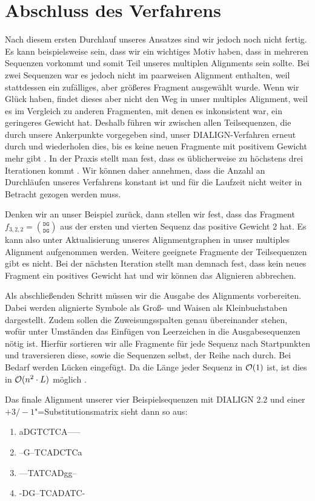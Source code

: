 \section{Abschluss des Verfahrens}

Nach diesem ersten Durchlauf unseres Ansatzes sind wir jedoch noch nicht fertig. Es kann beispielsweise sein, dass wir ein wichtiges Motiv haben, dass in mehreren Sequenzen vorkommt und somit Teil unseres multiplen Alignments sein sollte. Bei zwei Sequenzen war es jedoch nicht im paarweisen Alignment enthalten, weil stattdessen ein zufälliges, aber größeres Fragment ausgewählt wurde. Wenn wir Glück haben, findet dieses aber nicht den Weg in unser multiples Alignment, weil es im Vergleich zu anderen Fragmenten, mit denen es inkonsistent war, ein geringeres Gewicht hat. Deshalb führen wir zwischen allen Teilsequenzen, die durch unsere Ankerpunkte vorgegeben sind, unser DIALIGN-Verfahren erneut durch und wiederholen dies, bis es keine neuen Fragmente mit positivem Gewicht mehr gibt \cite{mdw96}. In der Praxis stellt man fest, dass es üblicherweise zu höchstens drei Iterationen kommt \cite{m99}. Wir können daher annehmen, dass die Anzahl an Durchläufen unseres Verfahrens konstant ist und für die Laufzeit nicht weiter in Betracht gezogen werden muss.

Denken wir an unser Beispiel zurück, dann stellen wir fest, dass das Fragment $f_{3,2,2} = $$ {\texttt{DG}}\choose{\texttt{DG}}$ aus der ersten und vierten Sequenz das positive Gewicht 2 hat. Es kann also unter Aktualisierung unseres Alignmentgraphen in unser multiples Alignment aufgenommen werden. Weitere geeignete Fragmente der Teilsequenzen gibt es nicht. Bei der nächsten Iteration stellt man demnach fest, dass kein neues Fragment ein positives Gewicht hat und wir können das Alignieren abbrechen.

Als abschließenden Schritt müssen wir die Ausgabe des Alignments vorbereiten. Dabei werden alignierte Symbole als Groß- und Waisen als Kleinbuchstaben dargestellt. Zudem sollen die Zuweisungsspalten genau übereinander stehen, wofür unter Umständen das Einfügen  von Leerzeichen in die Ausgabesequenzen nötig ist. Hierfür sortieren wir alle Fragmente für jede Sequenz nach Startpunkten und traversieren diese, sowie die Sequenzen selbst, der Reihe nach durch. Bei Bedarf werden Lücken eingefügt. Da die Länge jeder Sequenz in $\mathcal{O}(1)$ ist, ist dies in $\mathcal{O}(n^2\cdot L)$ möglich \cite{m99}.

Das finale Alignment unserer vier Beispielsequenzen mit DIALIGN 2.2 und einer $+3/-1$"=Substitutionsmatrix sieht dann so aus:
\ttfamily
\begin{enumerate}[topsep=0pt,itemsep=-1ex,partopsep=1ex,parsep=1ex]
	\item aDGTCTCA-----
	\item --G--TCADCTCa
	\item ---TATCADgg--
	\item -DG--TCADATC-
\end{enumerate}
\normalfont 

